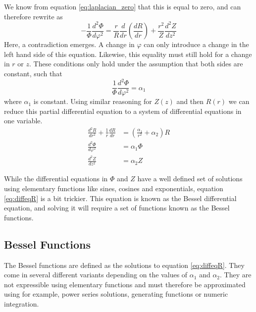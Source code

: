 We know from equation \ref{eq:laplacian_zero} that this is equal to zero,
and can therefore rewrite as
\begin{equation}
    -\frac{1}{\varPhi} \frac{d^2 \varPhi}{d\varphi^2} =
    \frac{r}{R} \frac{d}{dr} \left(\frac{dR}{dr} \right)
    + \frac{r^2}{Z} \frac{d^2 Z}{dz^2}
\end{equation}
Here, a contradiction emerges. A change in $\varphi$ can only
introduce a change in the left hand side of this equation. Likewise,
this equality must still hold for a change in $r$ or $z$. These
conditions only hold under the assumption that both sides are constant,
such that
\begin{equation}
    \frac{1}{\varPhi} \frac{d^2 \varPhi}{d\varphi^2} = \alpha_1
\end{equation}
where $\alpha_1$ is constant. Using similar reasoning for $Z(z)$
and then $R(r)$ we can reduce this partial differential equation to
a system of differential equations in one variable.
\begin{align}
    \frac{d^2R}{dr^2} + \frac{1}{r} \frac{dR}{dr} & =
    \left( \frac{\alpha_1}{r^2} + \alpha_2 \right)R
    \label{eq:diffeqR}                                                \\
    \frac{d^2 \varPhi}{d\varphi^2}                & = \alpha_1\varPhi
    \label{eq:diffeqPhi}                                              \\
    \frac{d^2 Z}{dz^2}                            & = \alpha_2 Z
    \label{eq:diffeqZ}
\end{align}

While the differential equations in $\varPhi$ and $Z$ have a well defined
set of solutions using elementary functions like sines, cosines and exponentials,
equation \ref*{eq:diffeqR} is a bit trickier. This equation is known as
the Bessel differential equation, and solving it will require a
set of functions known as the Bessel functions. \cite{weisstein_bessel}

\subsection{Bessel Functions}
The Bessel functions are defined as the solutions to equation \ref*{eq:diffeqR}.
They come in several different variants depending on the values of $\alpha_1$ and
$\alpha_2$. They are not expressible using elementary functions and must therefore
be approximated using for example, power series solutions, generating functions
or numeric integration.

